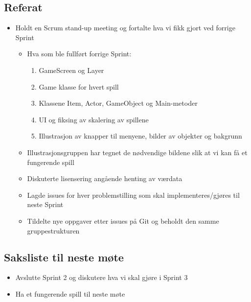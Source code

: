 \documentclass[11pt]{meetingmins}
\begin{document}
\maketitle
\subsection{Referat}
\begin{itemize}
	\item Holdt en Scrum stand-up meeting og fortalte hva vi fikk gjort ved forrige Sprint 
	\begin{itemize} 
		\item Hva som ble fullf{\o}rt forrige Sprint: 
		\begin{enumerate}
			\item GameScreen og Layer 
			\item Game klasse for hvert spill 
			\item Klassene Item, Actor, GameObject og Main-metoder 
			\item UI og fiksing av skalering av spillene 
			\item Illustrasjon av knapper til menyene, bilder av objekter og bakgrunn
		\end{enumerate}
		\item Illustrasjonsgruppen har tegnet de nødvendige bildene slik at vi kan få et fungerende spill 
		
		\item Diskuterte lisensering angående henting av værdata 

		\item Lagde issues for hver problemstilling som skal implementeres/gjøres til neste Sprint 

		\item Tildelte nye oppgaver etter issues på Git og beholdt den samme gruppestrukturen 

	\end{itemize}
\end{itemize}

\subsection{Saksliste til neste m{\o}te}
\begin{itemize}
\item Avslutte Sprint 2 og diskutere hva vi skal gjøre i Sprint 3  
\item Ha et fungerende spill til neste møte 
\end{itemize}
\end{document}
